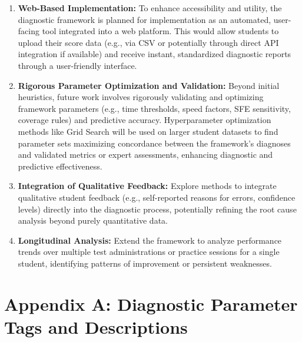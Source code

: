 \documentclass{article}
\begin{document}
\begin{enumerate}
    \item \textbf{Web-Based Implementation:} To enhance accessibility and utility, the diagnostic framework is planned for implementation as an automated, user-facing tool integrated into a web platform. This would allow students to upload their score data (e.g., via CSV or potentially through direct API integration if available) and receive instant, standardized diagnostic reports through a user-friendly interface.
   \item \textbf{Rigorous Parameter Optimization and Validation:} Beyond initial heuristics, future work involves rigorously validating and optimizing framework parameters (e.g., time thresholds, speed factors, SFE sensitivity, coverage rules) and predictive accuracy. Hyperparameter optimization methods like Grid Search will be used on larger student datasets to find parameter sets maximizing concordance between the framework's diagnoses and validated metrics or expert assessments, enhancing diagnostic and predictive effectiveness.
    \item \textbf{Integration of Qualitative Feedback:} Explore methods to integrate qualitative student feedback (e.g., self-reported reasons for errors, confidence levels) directly into the diagnostic process, potentially refining the root cause analysis beyond purely quantitative data.
    \item \textbf{Longitudinal Analysis:} Extend the framework to analyze performance trends over multiple test administrations or practice sessions for a single student, identifying patterns of improvement or persistent weaknesses.
\end{enumerate}
\newpage
\appendix
\section*{Appendix A: Diagnostic Parameter Tags and Descriptions} %

\vspace{1em} %
\end{document}
